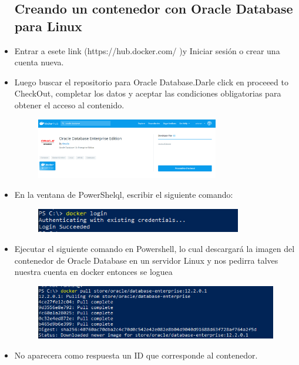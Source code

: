 \begin{itemize}
\subsection{ Creando un contenedor con Oracle Database para Linux}
	\item Entrar a esete link (https://hub.docker.com/ )y Iniciar sesión o crear una cuenta nueva.
	\item Luego buscar  el repositorio para Oracle Database.Darle click en proceeed to  CheckOut, completar los datos y aceptar las condiciones obligatorias para obtener el acceso al contenido.
		\begin{figure}[H]
		\begin{center}
		\includegraphics[width=8cm]{./Imagenes/3}
		\end{center}
		\end{figure}
	\item En la ventana de PowerShelql, escribir el siguiente comando:
		\begin{figure}[H]
		\begin{center}
		\includegraphics[width=9cm]{./Imagenes/4}
		\end{center}
		\end{figure}
	\item Ejecutar el siguiente comando en Powershell, lo cual descargará la imagen del contenedor de Oracle Database en un servidor Linux y nos pedirra talves nuestra cuenta en docker entonces se loguea 
		\begin{figure}[H]
		\begin{center}
		\includegraphics[width=15cm]{./Imagenes/5}
		\end{center}
		\end{figure}
	\item No aparecera como  respuesta  un ID que corresponde al contenedor.

\end{itemize}
